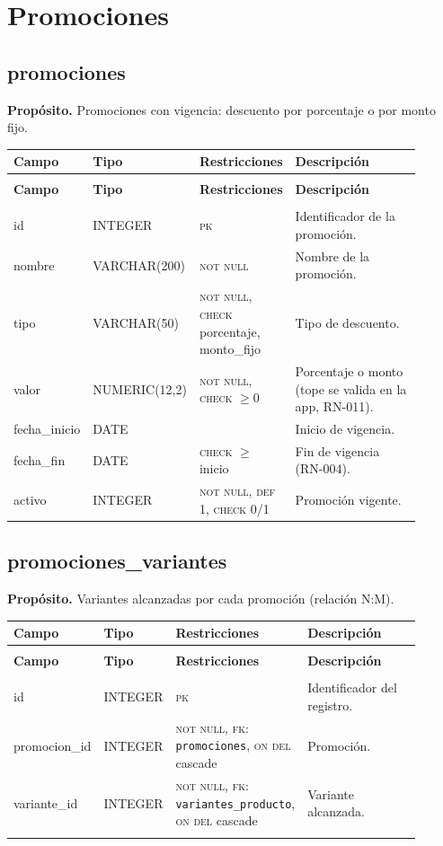\documentclass[11pt]{article}
\makeatletter
\newenvironment{campos}{%
  \par\footnotesize
  \setlength{\LTpre}{0.3ex}\setlength{\LTpost}{0.6ex}
  \begin{longtable}{@{}>{\ttfamily}p{0.165\linewidth} >{\ttfamily}p{0.150\linewidth} p{0.205\linewidth} >{\raggedright\arraybackslash}p{0.385\linewidth}@{}}
  \toprule
  \normalfont\bfseries Campo & \normalfont\bfseries Tipo & \normalfont\bfseries Restricciones & \normalfont\bfseries Descripción \\
  \midrule \endfirsthead
  \multicolumn{4}{@{}l}{\footnotesize\itshape \dots\ continuación}\\[0.3ex]
  \toprule
  \normalfont\bfseries Campo & \normalfont\bfseries Tipo & \normalfont\bfseries Restricciones & \normalfont\bfseries Descripción \\
  \midrule \endhead
  \midrule \multicolumn{4}{r@{}}{\footnotesize\itshape continúa en la siguiente página}\\ \endfoot
  \bottomrule \endlastfoot
}{%
  \end{longtable}\par
}
\newcommand{\proposito}[1]{\par\vspace{0.2ex}\noindent\colorbox{brandlight}{\parbox{\dimexpr\linewidth-2\fboxsep}{\small\textbf{Propósito.} #1}}\par\vspace{0.8ex}}
\newcommand{\pk}{\textsc{pk}}
\newcommand{\fk}[1]{\textsc{fk}: \texttt{#1}}
\newcommand{\nn}{\textsc{not null}}
\newcommand{\uq}{\textsc{unique}}
\makeatother
\begin{document}
\section{Promociones}

\subsection{promociones}
\proposito{Promociones con vigencia: descuento por porcentaje o por monto fijo.}
\begin{campos}
id           & INTEGER       & \pk{}   & Identificador de la promoción. \\
nombre       & VARCHAR(200)  & \nn     & Nombre de la promoción. \\
tipo         & VARCHAR(50)   & \nn, \textsc{check} porcentaje, monto\_fijo & Tipo de descuento. \\
valor        & NUMERIC(12,2) & \nn, \textsc{check} $\geq 0$ & Porcentaje o monto (tope se valida en la app, RN-011). \\
fecha\_inicio & DATE         &         & Inicio de vigencia. \\
fecha\_fin   & DATE          & \textsc{check} $\geq$ inicio & Fin de vigencia (RN-004). \\
activo       & INTEGER       & \nn, \textsc{def} 1, \textsc{check} 0/1 & Promoción vigente. \\
\end{campos}

\subsection{promociones\_variantes}
\proposito{Variantes alcanzadas por cada promoción (relación N:M).}
\begin{campos}
id           & INTEGER & \pk{}   & Identificador del registro. \\
promocion\_id & INTEGER & \nn, \fk{promociones}, \textsc{on del} cascade & Promoción. \\
variante\_id & INTEGER & \nn, \fk{variantes\_producto}, \textsc{on del} cascade & Variante alcanzada. \\
\multicolumn{4}{@{}p{0.97\linewidth}}{\footnotesize\itshape Regla de tabla: \uq{} (\texttt{promocion\_id}, \texttt{variante\_id}).} \\
\end{campos}

\end{document}
